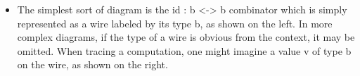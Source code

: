 \documentclass[preprint]{sigplanconf}
\begin{document}
\begin{itemize}
\item The simplest sort of diagram is the {{id : b <-> b}} combinator which
  is simply represented as a wire labeled by its type {{b}}, as shown on the
  left. In more complex diagrams, if the type of a wire is obvious from the
  context, it may be omitted. When tracing a computation, one might imagine a
  value {{v}} of type {{b}} on the wire, as shown on the right.

  \begin{multicols}{2}
\begin{center}
\end{center}
\begin{center}
\end{center}
  \end{multicols}


\end{itemize}
\end{document}
